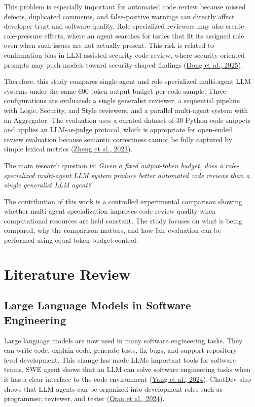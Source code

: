\documentclass[pdflatex,sn-mathphys-num]{sn-jnl}
\newcommand{\apa}[2]{\hyperlink{cite.#1}{#2}}
\theoremstyle{thmstyleone}
\theoremstyle{thmstyletwo}
\theoremstyle{thmstylethree}
\begin{document}
This problem is especially important for automated code review because missed defects, duplicated comments, and false-positive warnings can directly affect developer trust and software quality. Role-specialized reviewers may also create role-pressure effects, where an agent searches for issues that fit its assigned role even when such issues are not actually present. This risk is related to confirmation bias in LLM-assisted security code review, where security-oriented prompts may push models toward security-shaped findings (\apa{dong2025}{Dong et al., 2025}).

Therefore, this study compares single-agent and role-specialized multi-agent LLM systems under the same 600-token output budget per code sample. Three configurations are evaluated: a single generalist reviewer, a sequential pipeline with Logic, Security, and Style reviewers, and a parallel multi-agent system with an Aggregator. The evaluation uses a curated dataset of 30 Python code snippets and applies an LLM-as-judge protocol, which is appropriate for open-ended review evaluation because semantic correctness cannot be fully captured by simple lexical metrics (\apa{zheng2023}{Zheng et al., 2023}).

The main research question is: \emph{Given a fixed output-token budget, does a role-specialized multi-agent LLM system produce better automated code reviews than a single generalist LLM agent?}

The contribution of this work is a controlled experimental comparison showing whether multi-agent specialization improves code review quality when computational resources are held constant. The study focuses on what is being compared, why the comparison matters, and how fair evaluation can be performed using equal token-budget control.

\section{Literature Review}\label{sec:literature_review}

\subsection{Large Language Models in Software Engineering}

Large language models are now used in many software engineering tasks. They can write code, explain code, generate tests, fix bugs, and support repository level development. This change has made LLMs important tools for software teams. SWE agent shows that an LLM can solve software engineering tasks when it has a clear interface to the code environment (\apa{yang2024}{Yang et al., 2024}). ChatDev also shows that LLM agents can be organized into development roles such as programmer, reviewer, and tester (\apa{qian2024}{Qian et al., 2024}).
\end{document}
